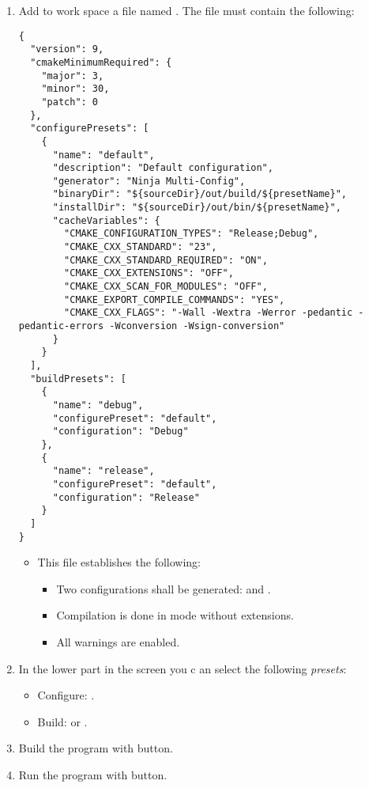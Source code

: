 \begin{enumerate}
\item
Add to work space a file named
. 
The file must contain the following:

\begin{lstlisting}
{
  "version": 9,
  "cmakeMinimumRequired": {
    "major": 3,
    "minor": 30,
    "patch": 0
  },
  "configurePresets": [
    {
      "name": "default",
      "description": "Default configuration",
      "generator": "Ninja Multi-Config",
      "binaryDir": "${sourceDir}/out/build/${presetName}",
      "installDir": "${sourceDir}/out/bin/${presetName}",
      "cacheVariables": {
        "CMAKE_CONFIGURATION_TYPES": "Release;Debug",
        "CMAKE_CXX_STANDARD": "23",
        "CMAKE_CXX_STANDARD_REQUIRED": "ON",
        "CMAKE_CXX_EXTENSIONS": "OFF",
        "CMAKE_CXX_SCAN_FOR_MODULES": "OFF",
        "CMAKE_EXPORT_COMPILE_COMMANDS": "YES",
        "CMAKE_CXX_FLAGS": "-Wall -Wextra -Werror -pedantic -pedantic-errors -Wconversion -Wsign-conversion"
      }
    }
  ],
  "buildPresets": [
    {
      "name": "debug",
      "configurePreset": "default",
      "configuration": "Debug"
    },
    {
      "name": "release",
      "configurePreset": "default",
      "configuration": "Release"
    }
  ]
}
\end{lstlisting}

  \begin{itemize}
    \item This file establishes the following:
      \begin{itemize}
        \item Two configurations shall be generated:
               and .
        \item Compilation is done in  mode without extensions.
        \item All warnings are enabled.
      \end{itemize}
  \end{itemize}

\item 
In the lower part in the screen you c an select the following 
      \emph{presets}:
  \begin{itemize}
    \item Configure: .
    \item Build:  or .
  \end{itemize}

\item
Build the program with  button.

\item
Run the program with  button. 

\end{enumerate}

